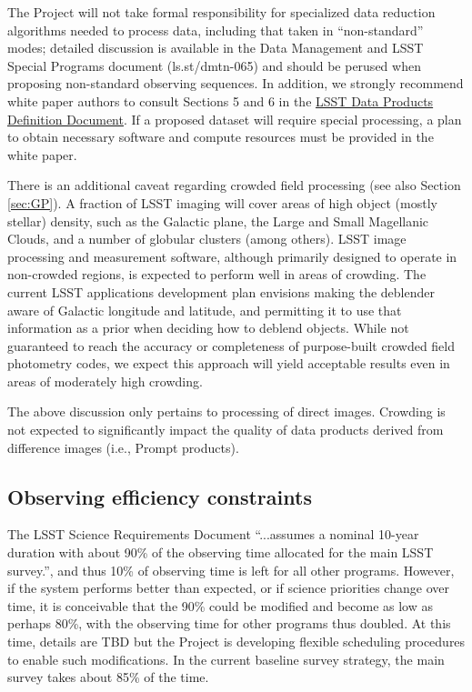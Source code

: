 \documentclass[DM,lsstdraft,toc,usenatbib]{lsstdoc}
\begin{document}
The Project will not take formal responsibility for specialized data reduction algorithms 
needed to process data, including that taken in ``non-standard'' modes; detailed discussion is 
available in the Data Management and LSST Special Programs document (ls.st/dmtn-065) and should
be perused when proposing non-standard observing sequences. In addition, we strongly recommend 
white paper authors to 
consult Sections 5 and 6 in the \href{http://ls.st/dpdd}{LSST Data Products Definition Document}. If 
a proposed dataset will require special processing, a plan to obtain necessary software and compute resources 
must be provided in the white paper. 

There is an additional caveat regarding crowded field processing (see also Section \ref{sec:GP}). 
A fraction of LSST imaging will cover areas of high object (mostly stellar) density, such as the 
Galactic plane, the Large and Small Magellanic Clouds, and a number of globular clusters (among 
others). LSST image processing and measurement software, although primarily designed to operate 
in non-crowded regions, is expected to perform well in areas of crowding. The current LSST applications 
development plan envisions making the deblender aware of Galactic longitude and latitude, and 
permitting it to use that information as a prior when deciding how to deblend objects. While not 
guaranteed to reach the accuracy or completeness of purpose-built crowded field photometry codes, 
we expect this approach will yield acceptable results even in areas of moderately high crowding.

The above discussion only pertains to processing of direct images. Crowding is not expected to 
significantly impact the quality of data products derived from difference images (i.e., Prompt 
products).


\subsection{Observing efficiency constraints} 

The LSST Science Requirements Document  ``...assumes a nominal 10-year duration with about 90\% 
of the observing time allocated for the main LSST survey.'', and thus 10\% of observing time is left for 
all other programs. However, if the system performs better than expected, or if science priorities 
change over time, it is conceivable that the 90\% could be modified and become as low as perhaps 80\%, 
with the observing time for other programs thus doubled. At this time, details are TBD but the Project
is developing flexible scheduling procedures to enable such modifications. In the current baseline
survey strategy, the main survey takes about 85\% of the time. 
\end{document}
